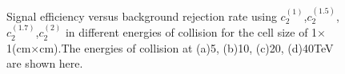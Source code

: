 \begin{figure}
\begin{center}

\end{center}
\caption{Signal efficiency versus background rejection rate using $c_2^{(1)}$,$c_2^{(1.5)}$,$c_2^{(1.7)}$,$c_2^{(2)}$ in different energies of collision for the cell size of  1$\times$1(cm$\times$cm).The energies of collision at (a)5, (b)10, (c)20, (d)40TeV are shown here.}
\label{cluster_r012_c_variable}
\end{figure}


